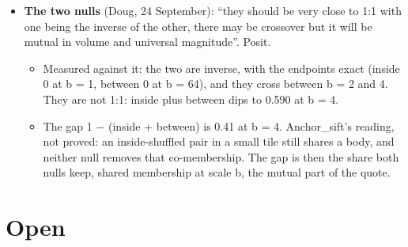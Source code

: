 \begin{itemize}
\begin{itemize}
\item Derived: E is a sum over edges, and a departure is linear in E and in the draws' sums. The departure of a whole is the sum of its edges' departures, exactly: the integral of its constituents, with the edge as the constituent. The whole equals its tiles plus its seams at every tile size (proved).
\item Built: each body's curve over its box, the six bounds of the quote. What the “vector magnitude difference” is, as a number, is not defined here. Open.
\end{itemize}
\item \textbf{The two nulls} (Doug, 24 September): “they should be very close to 1:1 with one being the inverse of the other, there may be crossover but it will be mutual in volume and universal magnitude”. Posit.

\begin{itemize}
\item Measured against it: the two are inverse, with the endpoints exact (inside 0 at b = 1, between 0 at b = 64), and they cross between b = 2 and 4. They are not 1:1: inside plus between dips to 0.590 at b = 4.
\item The gap 1 − (inside + between) is 0.41 at b = 4. Anchor\_\allowbreak{}sift's reading, not proved: an inside-shuffled pair in a small tile still shares a body, and neither null removes that co-membership. The gap is then the share both nulls keep, shared membership at scale b, the mutual part of the quote.
\end{itemize}
\end{itemize}

\section{\texorpdfstring{Open}{Open}}

